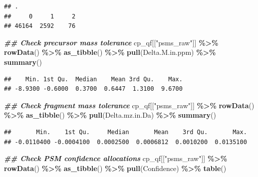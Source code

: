 \documentclass[9pt,a4paper,]{extarticle}
\newenvironment{Shaded}{\begin{snugshade}}{\end{snugshade}}
\newcommand{\DocumentationTok}[1]{\textcolor[rgb]{0.56,0.35,0.01}{\textbf{\textit{#1}}}}
\newcommand{\FunctionTok}[1]{\textcolor[rgb]{0.13,0.29,0.53}{\textbf{#1}}}
\newcommand{\NormalTok}[1]{#1}
\newcommand{\SpecialCharTok}[1]{\textcolor[rgb]{0.81,0.36,0.00}{\textbf{#1}}}
\newcommand{\StringTok}[1]{\textcolor[rgb]{0.31,0.60,0.02}{#1}}
\begin{document}
\begin{verbatim}
## .
##     0     1     2 
## 46164  2592    76
\end{verbatim}

\begin{Shaded}
\begin{Highlighting}[]
\DocumentationTok{\#\# Check precursor mass tolerance}
\NormalTok{cp\_qf[[}\StringTok{"psms\_raw"}\NormalTok{]] }\SpecialCharTok{\%\textgreater{}\%} 
  \FunctionTok{rowData}\NormalTok{() }\SpecialCharTok{\%\textgreater{}\%} 
  \FunctionTok{as\_tibble}\NormalTok{() }\SpecialCharTok{\%\textgreater{}\%} 
  \FunctionTok{pull}\NormalTok{(Delta.M.in.ppm) }\SpecialCharTok{\%\textgreater{}\%} 
  \FunctionTok{summary}\NormalTok{()}
\end{Highlighting}
\end{Shaded}

\begin{verbatim}
##    Min. 1st Qu.  Median    Mean 3rd Qu.    Max. 
## -8.9300 -0.6000  0.3700  0.6447  1.3100  9.6700
\end{verbatim}

\begin{Shaded}
\begin{Highlighting}[]
\DocumentationTok{\#\# Check fragment mass tolerance}
\NormalTok{cp\_qf[[}\StringTok{"psms\_raw"}\NormalTok{]] }\SpecialCharTok{\%\textgreater{}\%} 
  \FunctionTok{rowData}\NormalTok{() }\SpecialCharTok{\%\textgreater{}\%} 
  \FunctionTok{as\_tibble}\NormalTok{() }\SpecialCharTok{\%\textgreater{}\%} 
  \FunctionTok{pull}\NormalTok{(Delta.mz.in.Da) }\SpecialCharTok{\%\textgreater{}\%} 
  \FunctionTok{summary}\NormalTok{()}
\end{Highlighting}
\end{Shaded}

\begin{verbatim}
##       Min.    1st Qu.     Median       Mean    3rd Qu.       Max. 
## -0.0110400 -0.0004100  0.0002500  0.0006812  0.0010200  0.0135100
\end{verbatim}

\begin{Shaded}
\begin{Highlighting}[]
\DocumentationTok{\#\# Check PSM confidence allocations}
\NormalTok{cp\_qf[[}\StringTok{"psms\_raw"}\NormalTok{]] }\SpecialCharTok{\%\textgreater{}\%} 
  \FunctionTok{rowData}\NormalTok{() }\SpecialCharTok{\%\textgreater{}\%} 
  \FunctionTok{as\_tibble}\NormalTok{() }\SpecialCharTok{\%\textgreater{}\%} 
  \FunctionTok{pull}\NormalTok{(Confidence) }\SpecialCharTok{\%\textgreater{}\%} 
  \FunctionTok{table}\NormalTok{()}
\end{Highlighting}
\end{Shaded}
\end{document}
